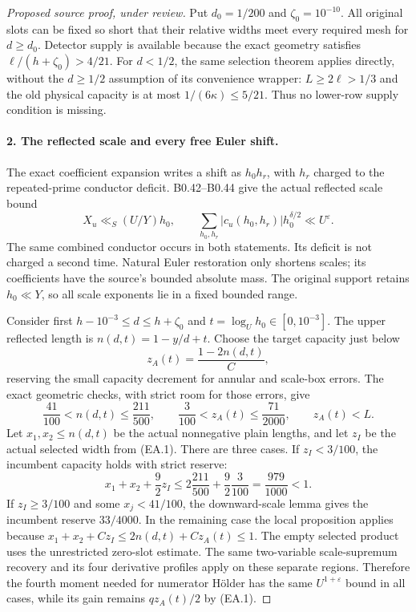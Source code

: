 \begin{proof}[Proposed source proof, under review]
Put $d_0=1/200$ and $\zeta_0=10^{-10}$. All original slots can be fixed
so short that their relative widths meet every required mesh for
$d\ge d_0$. Detector supply is available because the exact geometry
satisfies $\ell/(h+\zeta_0)>4/21$.
For $d<1/2$, the same selection theorem applies directly, without the
$d\ge1/2$ assumption of its convenience wrapper:
$L\ge2\ell>1/3$ and the old physical capacity is at most
$1/(6\kappa)\le5/21$. Thus no lower-row supply condition is missing.

\paragraph{2. The reflected scale and every free Euler shift.}
The exact coefficient expansion writes a shift as $h_0h_r$, with
$h_r$ charged to the repeated-prime conductor deficit. B0.42--B0.44 give
the actual reflected scale bound
\[
 X_u\ll_S (U/Y)h_0,
 \qquad \sum_{h_0,h_r}|c_u(h_0,h_r)|h_0^{\delta/2}
       \ll U^\varepsilon.                            \tag{EA.2}
\]
The same combined conductor occurs in both statements. Its deficit is
not charged a second time. Natural Euler restoration only shortens
scales; its coefficients have the source's bounded absolute mass.
The original support retains $h_0\ll Y$, so all scale exponents lie in
a fixed bounded range.

Consider first $h-10^{-3}\le d\le h+\zeta_0$ and
$t=\log_Uh_0\in[0,10^{-3}]$. The upper reflected length is
$n(d,t)=1-y/d+t$. Choose the target capacity just below
\[
 z_A(t)=\frac{1-2n(d,t)}{C},
\]
reserving the small capacity decrement for annular and scale-box errors.
The exact geometric checks, with strict room for those errors, give
\[
 \frac{41}{100}<n(d,t)\le\frac{211}{500},\qquad
 \frac3{100}<z_A(t)\le\frac{71}{2000},\qquad z_A(t)<L.
\]
Let $x_1,x_2\le n(d,t)$ be the actual nonnegative plain lengths, and
let $z_I$ be the actual selected width from (EA.1). There are three cases.
If $z_I<3/100$, the incumbent capacity holds with strict reserve:
\[
 x_1+x_2+\frac92z_I
 \le2\frac{211}{500}+\frac92\frac3{100}
 =\frac{979}{1000}<1.                                \tag{EA.3}
\]
If $z_I\ge3/100$ and some $x_j<41/100$, the downward-scale lemma gives
the incumbent reserve $33/4000$. In the remaining case the local
proposition applies because
$x_1+x_2+Cz_I\le2n(d,t)+Cz_A(t)\le1$.
The empty selected product uses the unrestricted zero-slot estimate.
The same two-variable scale-supremum recovery and its four derivative
profiles apply on these separate regions. Therefore the fourth moment
needed for numerator H\"older has the same $U^{1+\varepsilon}$ bound
in all cases, while its gain remains $qz_A(t)/2$ by (EA.1).


\end{proof}
